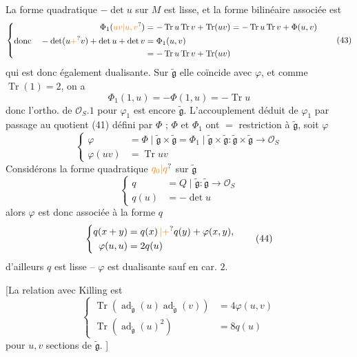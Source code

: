 La  forme quadratique  $-\det u$ sur $M$ est lisse, et la forme bilinéaire associée est
\[
\left\{\begin{aligned}
\Phi_1(\unsure{uv|u,v})&=-\operatorname{Tr}u\operatorname{Tr}v+\operatorname{Tr}(uv)=-\operatorname{Tr}u\operatorname{Tr}v+\Phi(u,v)\\
\text{donc}\quad-\det(u\unsure{+}v)+\det u+\det v&=\Phi_1(u,v)\\
&=-\operatorname{Tr}u\operatorname{Tr}v+\operatorname{Tr}(uv)
\end{aligned}\right.\tag*{(43)}
\]
qui est donc également dualisante. Sur $\widetilde{\mathfrak g}$ elle coïncide avec $\varphi$, et  comme $\operatorname{Tr}(1)=2$, on a
\[
\Phi_1(1,u)=-\Phi(1,u)=-\operatorname{Tr}u
\]
donc l'ortho. de $\mathcal O_S.1$ pour $\varphi_1$ est encore $\widetilde{\mathfrak g}$. L'accouplement   déduit de $\varphi_1$ par passage au quotient   (41) défini par $\Phi$ ;    $\Phi$ et $\Phi_1$ ont $=$ restriction à $\widetilde{\mathfrak g}$, soit $\varphi$
\[
\left\{\begin{aligned}
\varphi&=\Phi\mid\widetilde{\mathfrak g}\times\widetilde{\mathfrak g}
=\Phi_1\mid\widetilde{\mathfrak g}\times\widetilde{\mathfrak g}
:\widetilde{\mathfrak g}\times\widetilde{\mathfrak g}\to\mathcal O_S\\
\varphi(uv)&=\operatorname{Tr}uv
\end{aligned}\right.\tag*{(42)}
\]
Considérons la forme quadratique $\unsure{q_0|q}$ sur $\widetilde{\mathfrak g}$
\[
\left\{\begin{aligned}
q&=Q\mid\widetilde{\mathfrak g}:\widetilde{\mathfrak g}\longrightarrow\mathcal O_S\\
q(u)&=-\det u
\end{aligned}\right.\tag*{(43)}
\]
alors  $\varphi$ est donc associée à la forme $q$
\[
\left\{\begin{aligned}
q(x+y)&=q(x)\unsure{{}\,|+}q(y)+\varphi(x,y),\\
\varphi(u,u)&=2q(u)
\end{aligned}\right.\tag*{(44)}
\]
d'ailleurs $q$ est lisse -- $\varphi$ est dualisante sauf en car. $2$.

[La relation avec Killing est
\[
\left\{\begin{aligned}
\operatorname{Tr}(\operatorname{ad}_{\widetilde{\mathfrak g}}(u)\operatorname{ad}_{\widetilde{\mathfrak g}}(v))&=4\varphi(u,v)\\
\operatorname{Tr}(\operatorname{ad}_{\widetilde{\mathfrak g}}(u)^2)&=8q(u)
\end{aligned}\right.\tag*{(45)}
\]
pour $u,v$ sections de $\widetilde{\mathfrak g}$. \enspace]

